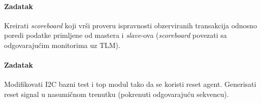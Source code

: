 \paragraph{Zadatak}

Kreirati \emph{scoreboard} koji vrši proveru ispravnosti obzerviranih
transakcija odnosno poredi podatke primljene od mastera i \emph{slave}-ova
(\emph{scoreboard} povezati sa odgovarajućim monitorima uz TLM).

\paragraph{Zadatak}

Modifikovati I2C bazni test i top modul tako da se koristi reset agent.
Generisati reset signal u nasumičnom trenutku (pokrenuti odgovarajuću sekvencu).


